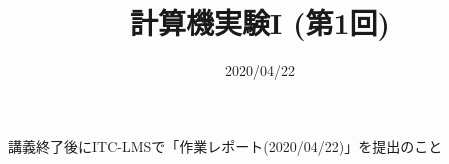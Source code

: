 \documentclass[10pt,dvipdfmx]{beamer}
\title{計算機実験I (第1回)}
\date{2020/04/22}
\begin{document}
\begin{frame}
  \titlepage
  \tableofcontents
  
  講義終了後にITC-LMSで「作業レポート(2020/04/22)」を提出のこと
\end{frame}



%
%



\end{document}
